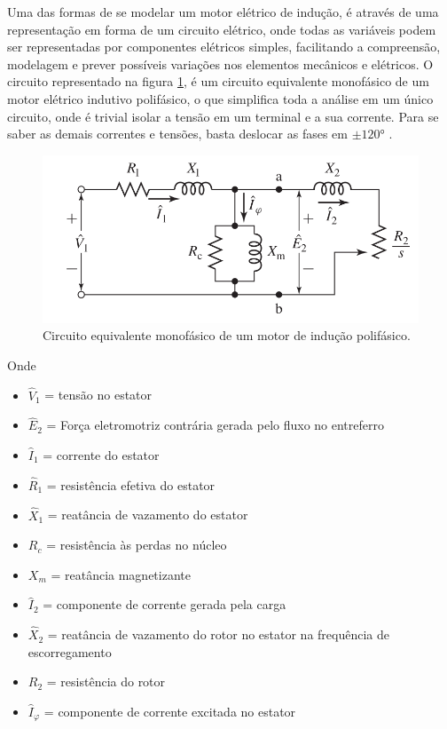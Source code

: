 Uma das formas de se modelar um motor elétrico de indução, é através de uma representação em forma de um circuito 
elétrico, onde todas as variáveis podem ser representadas por componentes elétricos simples, facilitando a compreensão, modelagem e
prever possíveis variações nos elementos mecânicos e elétricos. O circuito representado na figura \ref{fig:circuit_fitzgerald_p354},
é um circuito equivalente monofásico de um motor elétrico indutivo polifásico, o que simplifica toda a análise em um único circuito,
onde é trivial isolar a tensão em um terminal e a sua corrente. Para se saber as demais correntes e tensões, basta deslocar as fases
em $\pm\ang{120}$ \cite{Umans2003}.

\begin{figure}[H]
    \caption{Circuito equivalente monofásico de um motor de indução polifásico.}
    \begin{center}
        \includegraphics[scale=.35]{referencial/img/circuit_fitzgerald_p354.png}
    \end{center}
    \label{fig:circuit_fitzgerald_p354}
\end{figure}

Onde

\begin{itemize}
    \item $\hat{V}_1$ = tensão no estator
    \item $\hat{E}_2$ = Força eletromotriz contrária gerada pelo fluxo no entreferro
    \item $\hat{I}_1$ = corrente do estator
    \item $\hat{R}_1$ = resistência efetiva do estator
    \item $\hat{X}_1$ = reatância de vazamento do estator
    \item $R_c$ = resistência às perdas no núcleo
    \item $X_m$ = reatância magnetizante
    \item $\hat{I}_2$ = componente de corrente gerada pela carga
    \item $\hat{X}_2$ = reatância de vazamento do rotor no estator na frequência de escorregamento
    \item $R_2$ = resistência do rotor
    \item $\hat{I}_\varphi$ = componente de corrente excitada no estator
\end{itemize}

